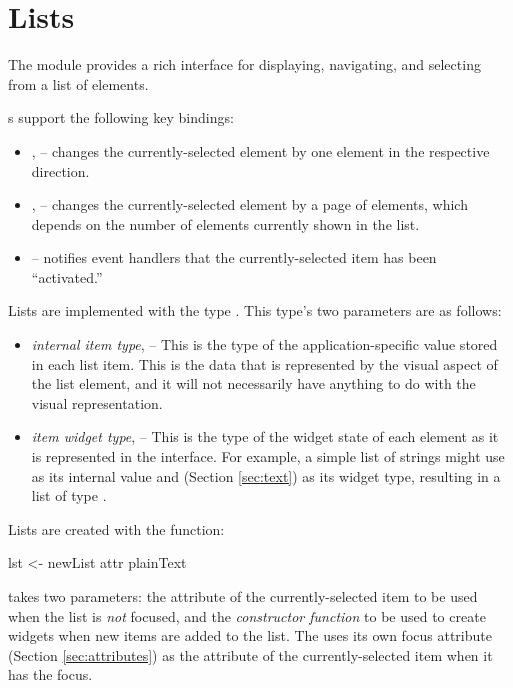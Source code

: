 \section{Lists}
\label{sec:lists}

The  module provides a rich interface for displaying,
navigating, and selecting from a list of elements.

s support the following key bindings:

\begin{itemize}
\item {},  -- changes the currently-selected element by
  one element in the respective direction.
\item {},  -- changes the currently-selected
  element by a page of elements, which depends on the number of
  elements currently shown in the list.
\item {} -- notifies event handlers that the
  currently-selected item has been ``activated.''
\end{itemize}

Lists are implemented with the type .  This type's two
parameters are as follows:

\begin{itemize}
\item \textit{internal item type},  -- This is the type of the
  application-specific value stored in each list item.  This is the
  data that is represented by the visual aspect of the list element,
  and it will not necessarily have anything to do with the visual
  representation.
\item \textit{item widget type},  -- This is the type of the
  widget state of each element as it is represented in the interface.
  For example, a simple list of strings might use  as its
  internal value and  (Section
  \ref{sec:text}) as its widget type, resulting in a list of type
  .
\end{itemize}

Lists are created with the  function:

\begin{haskellcode}
 lst <- newList attr plainText
\end{haskellcode}

 takes two parameters: the attribute of the
currently-selected item to be used when the list is \textit{not}
focused, and the \textit{constructor function} to be used to create
widgets when new items are added to the list.  The  uses its
own focus attribute (Section \ref{sec:attributes}) as the attribute of
the currently-selected item when it has the focus.


